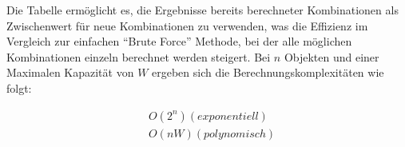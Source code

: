 Die Tabelle ermöglicht es, die Ergebnisse bereits berechneter Kombinationen als Zwischenwert für neue Kombinationen zu verwenden, was die Effizienz im Vergleich zur einfachen \enquote{Brute Force} Methode, bei der alle möglichen Kombinationen einzeln berechnet werden steigert. Bei $ n $ Objekten und einer Maximalen Kapazität von $ W $ ergeben sich die Berechnungskomplexitäten wie folgt: 

\begin{align}
    & O(2^n) (exponentiell) \\
    & O(nW) (polynomisch)
\end{align}




